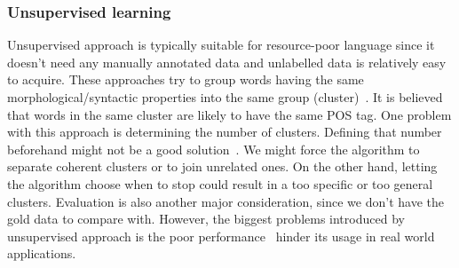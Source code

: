\documentclass[12pt,twoside,final,hidelinks]{ltthesis}
\theoremstyle{definition}
\begin{document}
\subsubsection{Unsupervised learning}
Unsupervised approach is typically suitable for resource-poor language since it doesn't need any manually annotated data and unlabelled data is relatively easy to acquire. These approaches try to group words having the same morphological/syntactic properties into the same group (cluster)~\cite{Christodoulopoulos:2010,unSupPOSClustering,chineseWhisper}. It is believed that words in the same cluster are likely to have the same POS tag. One problem with this approach is determining the number of clusters. Defining that number beforehand might not be a good solution~\cite{unSupPOSClustering}. We might force the algorithm to separate coherent clusters or to join unrelated ones. On the other hand, letting the algorithm choose when to stop could result in a too specific or too general clusters. Evaluation is also another major consideration, since we don't have the gold data to compare with. %
However, the biggest problems introduced by unsupervised approach is the poor performance~\cite{Christodoulopoulos:2010,Blunsom:2011} hinder its usage in real world applications. %
\end{document}
